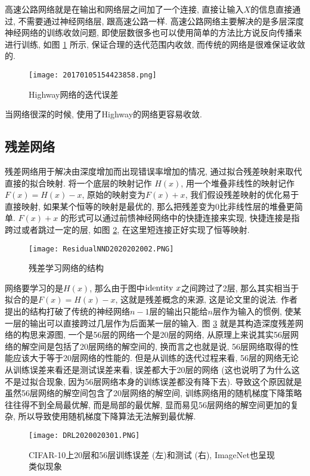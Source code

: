高速公路网络就是在输出和网络层之间加了一个连接, 直接让输入$X$的信息直接通过, 不需要通过神经网络层, 跟高速公路一样.
高速公路网络主要解决的是多层深度神经网络的训练收敛问题, 即使层数很多也可以使用简单的方法比方说反向传播来进行训练, 如图 \ref{20170105154423858} 所示, 保证合理的迭代范围内收敛, 而传统的网络是很难保证收敛的.
\begin{figure}[H]
    \centering
    \texttt{[image: 20170105154423858.png]}
    \caption{Highway网络的迭代误差}
    \label{20170105154423858}
    \vspace{-0.4cm}
\end{figure}
当网络很深的时候, 使用了Highway的网络更容易收敛.
\subsection{残差网络}
残差网络用于解决由深度增加而出现错误率增加的情况, 通过拟合残差映射来取代直接的拟合映射.
将一个底层的映射记作 $H(x)$, 用一个堆叠非线性的映射记作 $F(x) = H(x) - x$, 原始的映射变为$F(x) + x$, 我们假设残差映射的优化易于直接映射, 如果某个恒等的映射是最优的, 那么把残差变为0比非线性层的堆叠更简单.
$F(x) + x$ 的形式可以通过前愦神经网络中的快捷连接来实现, 快捷连接是指跨过或者跳过一定的层, 如图 \ref{ResidualNND2020202002}, 在这里短连接正好实现了恒等映射.
\begin{figure}[H]
    \centering
    \texttt{[image: ResidualNND2020202002.PNG]}
    \caption{残差学习网络的结构}
    \label{ResidualNND2020202002}
    \vspace{-0.4cm}
\end{figure}
网络要学习的是$H(x)$, 那么由于图中$\textup{identity}\,\, x$之间跨过了2层, 那么其实相当于拟合的是$F(x)=H (x)-x$, 这就是残差概念的来源, 这是论文里的说法.
作者提出的结构打破了传统的神经网络$n-1$层的输出只能给$n$层作为输入的惯例, 使某一层的输出可以直接跨过几层作为后面某一层的输入.
图 \ref{DRL2020020301} 就是其构造深度残差网络的构思来源图, 一个是56层的网络一个是20层的网络, 从原理上来说其实56层网络的解空间是包括了20层网络的解空间的, 换而言之也就是说, 56层网络取得的性能应该大于等于20层网络的性能的.
但是从训练的迭代过程来看, 56层的网络无论从训练误差来看还是测试误差来看, 误差都大于20层的网络 (这也说明了为什么这不是过拟合现象, 因为56层网络本身的训练误差都没有降下去).
导致这个原因就是虽然56层网络的解空间包含了20层网络的解空间, 训练网络用的随机梯度下降策略往往得不到全局最优解, 而是局部的最优解, 显而易见56层网络的解空间更加的复杂, 所以导致使用随机梯度下降算法无法解到最优解.
\begin{figure}[H]
    \centering
    \texttt{[image: DRL2020020301.PNG]}
    \caption{CIFAR-10上20层和56层训练误差 (左)和测试 (右), ImageNet也呈现类似现象}
    \label{DRL2020020301}
    \vspace{-0.4cm}
\end{figure}

